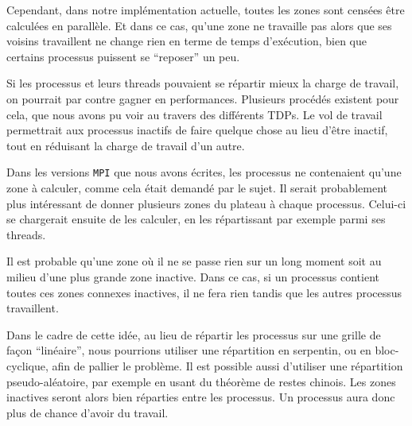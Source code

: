 Cependant, dans notre implémentation actuelle, toutes les zones sont censées être calculées en parallèle. Et dans ce cas, qu'une zone ne travaille pas alors que ses voisins travaillent ne change rien en terme de temps d'exécution, bien que certains processus puissent se ``reposer'' un peu. 

Si les processus et leurs threads pouvaient se répartir mieux la charge de travail, on pourrait par contre gagner en performances. Plusieurs procédés existent pour cela, que nous avons pu voir au travers des différents TDPs. Le vol de travail permettrait aux processus inactifs de faire quelque chose au lieu d'être inactif, tout en réduisant la charge de travail d'un autre. 

Dans les versions \texttt{MPI} que nous avons écrites, les processus ne contenaient qu'une zone à calculer, comme cela était demandé par le sujet. Il serait probablement plus intéressant de donner plusieurs zones du plateau à chaque processus. Celui-ci se chargerait ensuite de les calculer, en les répartissant par exemple parmi ses threads. 

Il est probable qu'une zone où il ne se passe rien sur un long moment soit au milieu d'une plus grande zone inactive. Dans ce cas, si un processus contient toutes ces zones connexes inactives, il ne fera rien tandis que les autres processus travaillent.

Dans le cadre de cette idée, au lieu de répartir les processus sur une grille de façon ``linéaire'', nous pourrions utiliser une répartition en serpentin, ou en bloc-cyclique, afin de pallier le problème. Il est possible aussi d'utiliser une répartition pseudo-aléatoire, par exemple en usant du théorème de restes chinois. Les zones inactives seront alors bien réparties entre les processus. Un processus aura donc plus de chance d'avoir du travail. 

